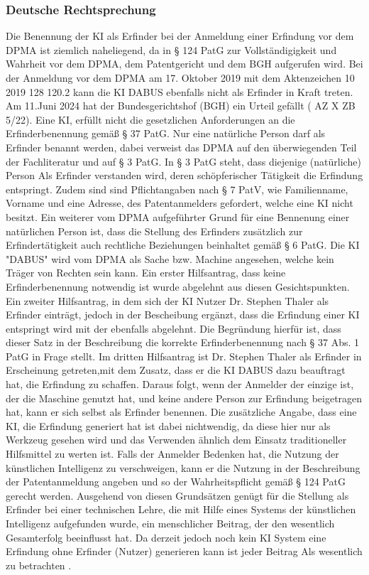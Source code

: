 \subsubsection{Deutsche Rechtsprechung}
Die Benennung der KI als Erfinder 
bei der Anmeldung einer Erfindung vor dem DPMA
ist ziemlich naheliegend, 
da in § 124 PatG zur Vollständigigkeit und Wahrheit vor dem
DPMA, 
dem Patentgericht und dem BGH aufgerufen wird.
Bei der Anmeldung vor dem DPMA am 17. Oktober 2019 mit dem Aktenzeichen
10 2019 128 120.2 kann die KI 
DABUS ebenfalls nicht als Erfinder in Kraft treten. 
Am 11.Juni 2024 hat der Bundesgerichtshof (BGH) ein Urteil gefällt 
( AZ X ZB 5/22).
Eine KI, 
erfüllt nicht die gesetzlichen Anforderungen an die Erfinderbenennung 
gemäß § 37 PatG. 
Nur eine natürliche Person darf 
als Erfinder benannt werden, 
dabei verweist das DPMA auf den überwiegenden Teil
der Fachliteratur und auf § 3 PatG.
In § 3 PatG steht, dass diejenige (natürliche) Person Als
Erfinder 
verstanden wird, 
deren schöpferischer Tätigkeit die Erfindung entspringt.
Zudem sind sind Pflichtangaben nach § 7 PatV, wie 
Familienname, Vorname und eine Adresse, 
des Patentanmelders gefordert,
welche eine KI nicht besitzt. 
Ein weiterer vom DPMA aufgeführter Grund für eine 
Bennenung einer natürlichen Person ist, dass 
die Stellung des Erfinders zusätzlich zur Erfindertätigkeit
auch rechtliche Beziehungen beinhaltet gemäß § 6 PatG.
Die KI "DABUS" wird vom DPMA als 
Sache bzw. Machine angesehen, 
welche kein Träger von Rechten sein kann.
Ein erster Hilfsantrag, dass keine Erfinderbenennung notwendig 
ist wurde abgelehnt aus diesen Gesichtspunkten.
Ein zweiter Hilfsantrag, in dem sich der KI Nutzer
Dr. Stephen Thaler als Erfinder einträgt, 
jedoch in der Bescheibung ergänzt, dass die Erfindung
einer KI entspringt wird mit der ebenfalls abgelehnt.
Die Begründung hierfür ist, dass dieser Satz in der 
Beschreibung die korrekte Erfinderbenennung nach
§ 37 Abs. 1 PatG in Frage stellt.
Im dritten Hilfsantrag ist Dr. Stephen Thaler
als Erfinder in Erscheinung getreten,mit dem 
Zusatz, dass er die KI DABUS dazu beauftragt hat,
die Erfindung zu schaffen.
Daraus folgt, wenn der Anmelder der einzige ist, 
der die Maschine genutzt hat, 
und keine andere Person zur Erfindung beigetragen hat, 
kann er sich selbst als Erfinder benennen. 
Die zusätzliche Angabe, dass eine KI, die Erfindung
generiert hat ist dabei nichtwendig, da diese hier nur als 
Werkzeug gesehen wird und das Verwenden ähnlich dem 
Einsatz traditioneller Hilfsmittel zu werten ist.
Falls der Anmelder Bedenken hat, 
die Nutzung der künstlichen Intelligenz zu verschweigen, 
kann er die Nutzung in der Beschreibung der Patentanmeldung angeben 
und so der Wahrheitspflicht gemäß § 124 PatG gerecht werden.
Ausgehend von diesen Grundsätzen genügt 
für die Stellung als Erfinder bei einer technischen Lehre, 
die mit Hilfe eines Systems der künstlichen
Intelligenz aufgefunden wurde, 
ein menschlicher Beitrag, 
der den wesentlich Gesamterfolg beeinflusst hat. 
Da derzeit jedoch noch kein KI System eine Erfindung ohne
Erfinder (Nutzer) generieren kann ist jeder Beitrag Als
wesentlich zu betrachten \cite{zivilsenatZB222024}.
\\

